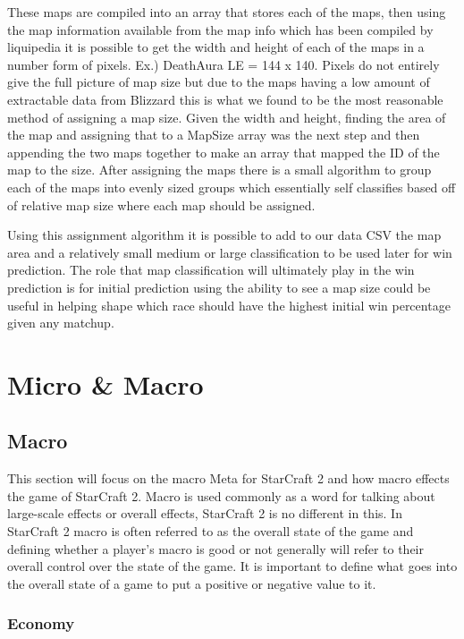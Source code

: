 \documentclass[a4paper,12pt]{report}
\begin{document}
These maps are compiled into an array that stores each of the maps, then using the map information available from the map info which has been compiled by liquipedia it is possible to get the width and height of each of the maps in a number form of pixels. Ex.) DeathAura LE = 144 x 140. Pixels do not entirely give the full picture of map size but due to the maps having a low amount of extractable data from Blizzard this is what we found to be the most reasonable method of assigning a map size. Given the width and height, finding the area of the map and assigning that to a MapSize array was the next step and then appending the two maps together to make an array that mapped the ID of the map to the size. After assigning the maps there is a small algorithm to group each of the maps into evenly sized groups which essentially self classifies based off of relative map size where each map should be assigned.

Using this assignment algorithm it is possible to add to our data CSV the map area and a relatively small medium or large classification to be used later for win prediction. The role that map classification will ultimately play in the win prediction is for initial prediction using the ability to see a map size could be useful in helping shape which race should have the highest initial win percentage given any matchup.

\section{Micro \& Macro}
\subsection{Macro}

This section will focus on the macro Meta for StarCraft 2 and how macro effects the game of StarCraft 2. Macro is used commonly as a word for talking about large-scale effects or overall effects, StarCraft 2 is no different in this. In StarCraft 2 macro is often referred to as the overall state of the game and defining whether a player’s macro is good or not generally will refer to their overall control over the state of the game. It is important to define what goes into the overall state of a game to put a positive or negative value to it.

\subsubsection{Economy}
\end{document}
